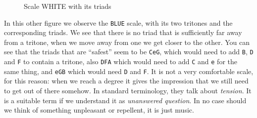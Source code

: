 \documentclass[]{report}
\begin{document}
\begin{figure}[H]
\begin{subfigure}{1\textwidth}
{
		}

	\end{subfigure}
	\caption{Scale \textsf{WHITE} with its triads}\label{fig:white-scale-with-its-triads}
\end{figure}
In this other figure we observe the \texttt{BLUE} scale, with its two tritones and the corresponding triads. We see that there is no triad that is sufficiently far away from a tritone, when we move away from one we get closer to the other. You can see that the triads that are ``safest'' seem to be \texttt{CeG}, which would need to add \texttt{B}, \texttt{D} and \texttt{F} to contain a tritone, also \texttt{DFA} which would need to add \texttt{C} and \texttt{e} for the same thing, and \texttt{eGB} which would need \texttt{D} and \texttt{F}.
It is not a very comfortable scale, for this reason: when we reach a degree it gives the impression that we still need to get out of there somehow. In standard terminology, they talk about \emph{tension}. It is a suitable term if we understand it as \emph{unanswered question}. In no case should we think of something unpleasant or repellent, it is just music.
\end{document}

